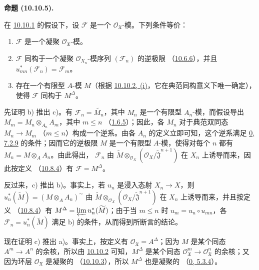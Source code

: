 \documentclass[UTF8,fontset=none,11pt,oneside,openany]{ctexbook}
\newenvironment{proposition}[1][]{%
  \par\medskip\noindent\textbf{命题 (#1).}\ %
}{\par}
\newcommand{\oldpage}[2][]{%
  \hypertarget{ega-source-page-#1-#2}{}%
  \marginnote{\scriptsize\textbf{#1}~|~#2}\ignorespaces}
\let\EGAOriginalLabel\label
\renewcommand{\label}[1]{\phantomsection\EGAOriginalLabel{#1}}
\begin{document}
\begin{proposition}[10.10.5]
\label{I.10.10.5-fr}
在 \hyperref[I.10.10.1-fr]{10.10.1} 的假设下，设
$\mathscr{F}$ 是一个 $\mathscr{O}_{\mathfrak{X}}$-模。下列条件等价：
\begin{enumerate}
  \item[a)] $\mathscr{F}$ 是一个凝聚 $\mathscr{O}_{\mathfrak{X}}$-模。
  \item[b)] $\mathscr{F}$ 同构于一个凝聚 $\mathscr{O}_{X_n}$-模序列
    $(\mathscr{F}_n)$ 的逆极限
    （\hyperref[I.10.6.6-fr]{10.6.6}），并且
    $u_{mn}^*(\mathscr{F}_n)=\mathscr{F}_m$。
  \item[c)] 存在一个有限型 $A$-模 $M$（根据
    \hyperref[I.10.10.2-fr]{10.10.2, (i)}，它在典范同构意义下唯一确定），使得
    $\mathscr{F}$ 同构于 $M^\Delta$。
\end{enumerate}
\end{proposition}

先证明 b) 推出 c)。有 $\mathscr{F}_n=\widetilde{M_n}$，其中 $M_n$ 是一个有限型
$A_n$-模，而假设导出
$M_m=M_n\otimes_{A_n}A_m$，其中 $m\leq n$
（\hyperref[I.1.6.5-fr]{1.6.5}）；因此，各 $M_n$ 对于典范双同态 $M_n\to M_m$
（$m\leq n$）构成一个逆系。由各 $A_n$ 的定义立即可知，这个逆系满足
\hyperref[0.7.2.9-fr]{0, 7.2.9} 的条件；因而它的逆极限 $M$ 是一个有限型
$A$-模，使得对每个 $n$ 都有 $M_n=M\otimes_A A_n$。由此得出，
$\mathscr{F}_n$ 由
$\widetilde M\otimes_{\mathscr{O}_X}
(\mathscr{O}_X/\widetilde{\mathfrak{J}}^{n+1})$ 在 $X_n$ 上诱导而来，因此按定义
（\hyperref[I.10.8.4-fr]{10.8.4}）有 $\mathscr{F}=M^\Delta$。

反过来，c) 推出 b)。事实上，若 $u_n$ 是浸入态射 $X_n\to X$，则
$u_n^*(\widetilde M)=(M\otimes_A A_n)^{\sim}$ 由
$\widetilde M\otimes_{\mathscr{O}_X}
(\mathscr{O}_X/\widetilde{\mathfrak{J}}^{n+1})$ 在 $X_n$ 上诱导而来，并且按定义
（\hyperref[I.10.8.4-fr]{10.8.4}）有
$M^\Delta=\varprojlim u_n^*(\widetilde M)$；由于当 $m\leq n$ 时
$u_m=u_n\circ u_{mn}$，各 $\mathscr{F}_n=u_n^*(\widetilde M)$ 满足 b) 的条件，从而得到所断言的结论。

现在证明 c) 推出 a)。事实上，按定义有
$\mathscr{O}_{\mathfrak{X}}=A^\Delta$；因为 $M$ 是某个同态
$A^m\to A^n$ 的余核，所以由
\hyperref[I.10.10.2-fr]{10.10.2} 可知，$M^\Delta$ 是某个同态
$\mathscr{O}_{\mathfrak{X}}^m\to\mathscr{O}_{\mathfrak{X}}^n$ 的余核；又因为环层
$\mathscr{O}_{\mathfrak{X}}$ 是凝聚的
（\hyperref[I.10.10.3-fr]{10.10.3}），所以 $M^\Delta$ 也是凝聚的
（\hyperref[0.5.3.4-fr]{0, 5.3.4}）。
\oldpage[I]{203}
\end{document}
